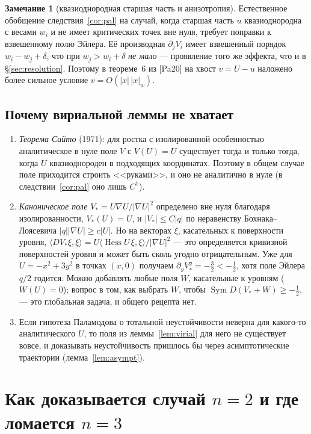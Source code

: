 \documentclass[11pt,a4paper]{article}
\theoremstyle{definition}
\newtheorem{remark}[theorem]{Замечание}
\DeclareMathOperator{\Hess}{Hess}
\DeclareMathOperator{\Sym}{Sym}
\begin{document}
\begin{remark}[квазиоднородная старшая часть и анизотропия]
Естественное обобщение следствия~\ref{cor:pal} на случай, когда старшая часть $u$ квазиоднородна
с весами $w_i$ и не имеет критических точек вне нуля, требует поправки к взвешенному полю Эйлера.
Её производная $\partial_jV_i$ имеет взвешенный порядок $w_i-w_j+\delta$, что при $w_j>w_i+\delta$
\emph{не мало} --- проявление того же эффекта, что и в \S\ref{sec:resolution}. Поэтому в теореме~6
из [Pa20] на хвост $v=U-u$ наложено более сильное условие $v=O(|x|\,|x|_w)$.
\end{remark}

\subsection{Почему вириальной леммы не хватает}\label{sec:limits}
\begin{enumerate}[leftmargin=*]
\item \emph{Теорема Сайто} (1971): для ростка с изолированной особенностью аналитическое в нуле поле $V$
с $V(U)=U$ существует тогда и только тогда, когда $U$ квазиоднороден в подходящих координатах.
Поэтому в общем случае поле приходится строить <<руками>>, и оно не аналитично в нуле
(в следствии~\ref{cor:pal} оно лишь $C^1$).
\item \emph{Каноническое поле} $V_*=U\nabla U/|\nabla U|^2$ определено вне нуля благодаря
изолированности, $V_*(U)=U$, и $|V_*|\le C|q|$ по неравенству Бохнака--Лоясевича $|q||\nabla U|\ge c|U|$.
Но на векторах $\xi$, касательных к поверхности уровня, $\langle DV_*\xi,\xi\rangle=U\langle\Hess U\,\xi,\xi\rangle/|\nabla U|^2$
--- это определяется кривизной поверхностей уровня и может быть сколь угодно отрицательным.
Уже для $U=-x^2+3y^2$ в точках $(x,0)$ получаем $\partial_yV_*^y=-\frac32<-\frac12$, хотя поле Эйлера
$q/2$ годится. Можно добавлять любые поля $W$, касательные к уровням ($W(U)=0$); вопрос в том, как выбрать
$W$, чтобы $\Sym D(V_*+W)\ge-\frac12$, --- это глобальная задача, и общего рецепта нет.
\item Если гипотеза Паламодова о тотальной неустойчивости неверна для какого-то аналитического $U$, то
поля из леммы~\ref{lem:virial} для него не существует вовсе, и доказывать неустойчивость пришлось бы
через асимптотические траектории (лемма~\ref{lem:asympt}).
\end{enumerate}

\section{Как доказывается случай $n=2$ и где ломается $n=3$}\label{sec:2d}
\end{document}
